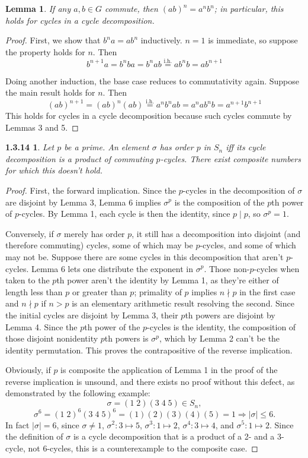 \documentclass{article}
\newtheorem{lemma}{Lemma}
\newtheorem*{1.3.14}{1.3.14}
\begin{document}
\begin{lemma}
  If any $a,b\in G$ commute, then $(ab)^{n}=a^{n}b^{n}$; in particular, this holds for cycles in a cycle decomposition.
\end{lemma}
\begin{proof}
  First, we show that $b^{n}a = ab^{n}$ inductively.
  $n=1$ is immediate, so suppose the property holds for $n$.
  Then
  \[
    b^{n+1}a = b^{n}ba = b^{n}ab\overset{\text{i.h.}}{=}ab^{n}b = ab^{n+1}
  \]

  Doing another induction, the base case reduces to commutativity again.
  Suppose the main result holds for $n$.
  Then
  \[
    (ab)^{n+1} = (ab)^{n}(ab) \overset{\text{i.h.}}{=}a^{n}b^{n}ab = a^{n}ab^{n}b = a^{n+1}b^{n+1}
  \]
  This holds for cycles in a cycle decomposition because such cycles commute by Lemmas 3 and 5.
\end{proof}
\begin{1.3.14}
  Let $p$ be a prime. An element $\sigma$ has order $p$ in $S_{n}$ iff its cycle decomposition is a product of commuting $p$-cycles.
  There exist composite numbers for which this doesn't hold.
\end{1.3.14}
\begin{proof}
  First, the forward implication.
  Since the $p$-cycles in the decomposition of $\sigma$ are disjoint by Lemma 3,
  Lemma 6 implies $\sigma^{p}$ is the composition of the $p$th power of $p$-cycles.
  By Lemma 1, each cycle is then the identity, since $p\mid p$, so $\sigma^{p}=1$.

  Conversely, if $\sigma$ merely has order $p$, it still has a decomposition into disjoint (and therefore commuting) cycles,
  some of which may be $p$-cycles, and some of which may not be.
  Suppose there are some cycles in this decomposition that aren't $p$-cycles.
  Lemma 6 lets one distribute the exponent in $\sigma^{p}$.
  Those non-$p$-cycles when taken to the $p$th power aren't the identity by Lemma 1, as they're either of length less than $p$ or greater than $p$;
  primality of $p$ implies $n\nmid p$ in the first case and $n\nmid p$ if $n > p$ is an elementary arithmetic result resolving the second.
  Since the initial cycles are disjoint by Lemma 3, their $p$th powers are disjoint by Lemma 4.
  Since the $p$th power of the $p$-cycles is the identity, the composition of those disjoint nonidentity $p$th powers is $\sigma^{p}$,
  which by Lemma 2 can't be the identity permutation.
  This proves the contrapositive of the reverse implication.

  Obviously, if $p$ is composite the application of Lemma 1 in the proof of the reverse implication is unsound,
  and there exists no proof without this defect, as demonstrated by the following example:
  \[
    \sigma = (1\;2)(3\;4\;5)\in S_{n},
  \]
  \[
    \sigma^{6}=(1\;2)^{6}(3\;4\;5)^{6}=(1)(2)(3)(4)(5)=1\Rightarrow|\sigma| \leq 6.
  \]
  In fact $|\sigma| = 6$, since $\sigma\neq 1$, $\sigma^{2}:3\mapsto 5$, $\sigma^{3}:1\mapsto 2$, $\sigma^{4}:3\mapsto 4$, and $\sigma^{5}:1\mapsto 2$.
  Since the definition of $\sigma$ is a cycle decomposition that is a product of a 2- and a 3-cycle, not 6-cycles,
  this is a counterexample to the composite case.
\end{proof}
\end{document}

